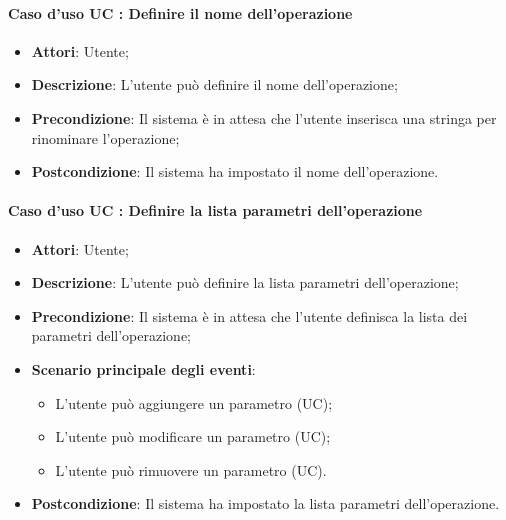\documentclass[../AnalisiDeiRequisiti.tex]{subfiles}
\begin{document}
		\paragraph{Caso d'uso UC : Definire il nome dell'operazione}
			\begin{itemize}
				\item \textbf{Attori}: Utente;
				\item \textbf{Descrizione}: L'utente può definire il nome dell'operazione;
				\item \textbf{Precondizione}: Il sistema è in attesa che l'utente inserisca
				una stringa per rinominare l'operazione;
				\item \textbf{Postcondizione}: Il sistema ha impostato il nome
				dell'operazione.
			\end{itemize}
		\paragraph{Caso d'uso UC : Definire la lista parametri dell'operazione}
			\begin{itemize}
				\item \textbf{Attori}: Utente;
				\item \textbf{Descrizione}: L'utente può definire la lista parametri
				dell'operazione;
				\item \textbf{Precondizione}: Il sistema è in attesa che l'utente definisca
				la lista dei parametri dell'operazione;
				\item \textbf{Scenario principale degli eventi}:
					\begin{itemize}
						\item L'utente può aggiungere un parametro (UC);
						\item L'utente può modificare un parametro (UC);
						\item L'utente può rimuovere un parametro (UC).
					\end{itemize}
				\item \textbf{Postcondizione}: Il sistema ha impostato la lista parametri
				dell'operazione.
			\end{itemize}
\end{document}
